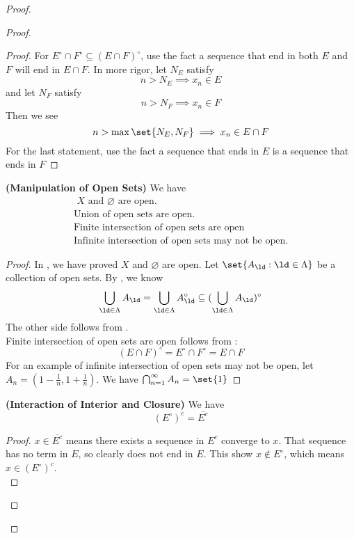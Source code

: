 \documentclass{report}
\begin{document}
\begin{proof}
\begin{proof}
\begin{proof}
For $E^\circ \cap F^\circ \subseteq (E\cap F)^\circ $, use the fact a sequence that end in both $E$ and  $F$ will end in  $E\cap F$. In more rigor, let $N_E$ satisfy
 \begin{equation*}
n>N_E\implies x_n\in E
\end{equation*}
and let $N_F$ satisfy
\begin{equation*}
n>N_F\implies x_n\in F
\end{equation*}
Then we see
\begin{equation*}
n>\max \set{N_E,N_F}\implies x_n\in E\cap F
\end{equation*}
For the last statement, use the fact a sequence that ends in $E$ is a sequence that ends in  $F$
\end{proof}
\begin{theorem}
\label{3.3.5}
\textbf{(Manipulation of Open Sets)} We have
\begin{gather*}
\text{ $X$ and  $\varnothing$ are open. }\\
\text{ Union of open sets are open. }\\
\text{ Finite intersection of open sets are open}\\
\text{ Infinite intersection of open sets may not be open. }
\end{gather*}
\end{theorem}
\begin{proof}
In , we have proved $X$ and $\varnothing$ are open. Let $\set{A_\ld :\ld \in\Lambda }$ be a collection of open sets. By , we know
\begin{equation*}
\bigcup_{\ld \in \Lambda } A_\ld= \bigcup_{\ld  \in \Lambda }A_\ld ^\circ \subseteq (\bigcup_{\ld  \in \Lambda } A_\ld )^\circ 
\end{equation*}
The other side follows from .\\

Finite intersection of open sets are open follows from :
\begin{equation*}
  (E\cap F)^\circ =E^\circ \cap F^\circ =E\cap F
\end{equation*}
For an example of infinite intersection of open sets may not be open, let $A_n=(1-\frac{1}{n},1+\frac{1}{n})$. We have $\bigcap_{n=1}^\infty A_n=\set{1}$
\end{proof}
\begin{theorem}
\label{3.3.6}
\textbf{(Interaction of Interior and Closure)} We have
\begin{equation*}
  (E^\circ )^c=\overline{E^c}
\end{equation*}
\end{theorem}
\begin{proof}
$x\in \overline{E^c}$ means there exists a sequence in $E^c$ converge to  $x$. That sequence has no term in $E$, so clearly does not end in  $E$. This show  $x\not \in E^\circ $, which means $x\in (E^\circ )^c$.\\


\end{proof}
\end{proof}
\end{proof}
\end{document}
